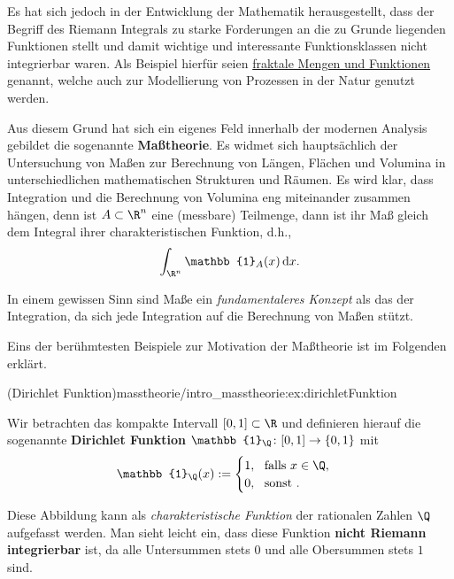 \par
Es hat sich jedoch in der Entwicklung der Mathematik herausgestellt, dass der Begriff des Riemann Integrals zu starke Forderungen an die zu Grunde liegenden Funktionen stellt und damit wichtige und interessante Funktionsklassen nicht integrierbar waren.
Als Beispiel hierfür seien \href{https://de.wikipedia.org/wiki/Fraktal}{fraktale Mengen und Funktionen} genannt, welche auch zur Modellierung von Prozessen in der Natur genutzt werden.

\par
Aus diesem Grund hat sich ein eigenes Feld innerhalb der modernen Analysis gebildet   die sogenannte \textbf{Maßtheorie}.
Es widmet sich hauptsächlich der Untersuchung von Maßen zur Berechnung von Längen, Flächen und Volumina in unterschiedlichen mathematischen Strukturen und Räumen.
Es wird klar, dass Integration und die Berechnung von Volumina eng miteinander zusammen hängen, denn ist \(A\subset\R^n\) eine (messbare) Teilmenge, dann ist ihr Maß gleich dem Integral ihrer charakteristischen Funktion, d.h.,
\begin{align*}
\int_{\R^n} \mathbb{1}_A(x)\,\mathrm{d}x.
\end{align*}
\par
In einem gewissen Sinn sind Maße ein \emph{fundamentaleres Konzept} als das der Integration, da sich jede Integration auf die Berechnung von Maßen stützt.

\par
Eins der berühmtesten Beispiele zur Motivation der Maßtheorie ist im Folgenden erklärt.
\begin{example}{(Dirichlet Funktion)}{masstheorie/intro_masstheorie:ex:dirichletFunktion}



\par
Wir betrachten das kompakte Intervall \([0,1] \subset \R\) und definieren hierauf die sogenannte \textbf{Dirichlet Funktion} \(\mathbb{1}_\Q \colon [0,1] \rightarrow \{0,1\}\) mit
\begin{align*}
\mathbb{1}_\Q(x) := \begin{cases} 1, \ \text{ falls } x \in \Q, \\ 0, \ \text{ sonst }.\end{cases}
\end{align*}
\par
Diese Abbildung kann als \emph{charakteristische Funktion} der rationalen Zahlen \(\Q\) aufgefasst werden.
Man sieht leicht ein, dass diese Funktion \textbf{nicht Riemann integrierbar} ist, da alle Untersummen stets \(0\) und alle Obersummen stets \(1\) sind.
\end{example}


